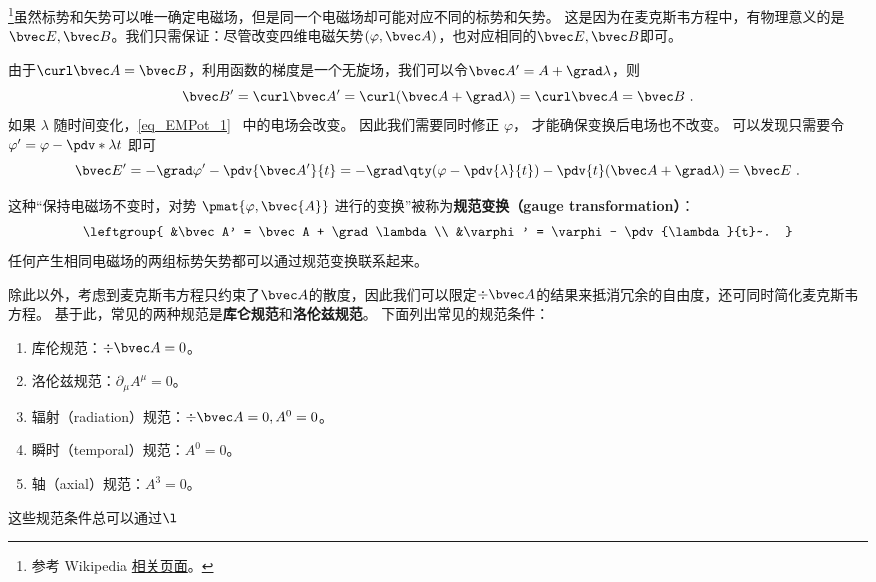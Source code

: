 
\begin{issues}
\issueDraft 
\end{issues}


\footnote{参考 Wikipedia \href{https://en.wikipedia.org/wiki/Gauge_fixing}{相关页面}。}虽然标势和矢势可以唯一确定电磁场，但是同一个电磁场却可能对应不同的标势和矢势。 这是因为在麦克斯韦方程中，有物理意义的是$\bvec E,\bvec B$。我们只需保证：尽管改变四维电磁矢势$(\varphi,\bvec A)$，也对应相同的$\bvec E,\bvec B$即可。

由于$\curl  \bvec A=\bvec B$，利用函数的梯度是一个无旋场，我们可以令$\bvec A'=A+\grad\lambda$，则
\begin{equation}
\bvec B' = \curl \bvec A' = \curl (\bvec A + \grad \lambda) = \curl \bvec A = \bvec B~.
\end{equation}
 如果 $\lambda$ 随时间变化，\autoref{eq_EMPot_1}~ 中的电场会改变。 因此我们需要同时修正 $\varphi$， 才能确保变换后电场也不改变。 可以发现只需要令 $\varphi' = \varphi - \pdv*{\lambda}{t}$ 即可
\begin{equation}
\bvec E' = -\grad \varphi' - \pdv{\bvec A'}{t} = -\grad \qty(\varphi - \pdv{\lambda}{t}) - \pdv{t} (\bvec A + \grad \lambda) = \bvec E~.
\end{equation}


这种“保持电磁场不变时，对势 $\pmat{\varphi, \bvec{A}}$ 进行的变换”被称为\textbf{规范变换（gauge transformation）}：
\begin{equation}\label{eq_Gauge_3}
\leftgroup{
&\bvec A' = \bvec A + \grad \lambda\\
&\varphi' = \varphi - \pdv{\lambda}{t}~.
}\end{equation}
任何产生相同电磁场的两组标势矢势都可以通过规范变换联系起来。

除此以外，考虑到麦克斯韦方程只约束了$\bvec A$的散度，因此我们可以限定$\div \bvec A$的结果来抵消冗余的自由度，还可同时简化麦克斯韦方程。
基于此，常见的两种规范是\textbf{库仑规范}和\textbf{洛伦兹规范}。
下面列出常见的规范条件：
\begin{enumerate}
\item 库伦规范：$\div \bvec A=0$。
\item 洛伦兹规范：$\partial_{\mu}A^{\mu}=0$。
\item 辐射（radiation）规范：$\div \bvec A=0,A^0=0$。
\item 瞬时（temporal）规范：$A^0=0$。
\item 轴（axial）规范：$A^3=0$。
\end{enumerate}
这些规范条件总可以通过$\l$